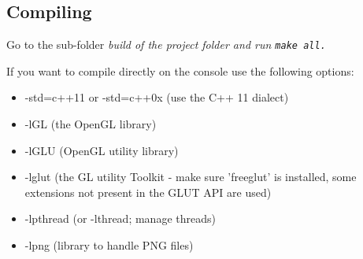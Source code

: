 \subsection{Compiling}
Go to the sub-folder \it{build} of the project folder and run \tt{make all}.\par
If you want to compile directly on the console use the following options:  
\begin{itemize}
	\item -std=c++11 or -std=c++0x (use the C++ 11 dialect)  
	\item -lGL (the OpenGL library)  
	\item -lGLU (OpenGL utility library)
	\item -lglut (the GL utility Toolkit - make sure 'freeglut' is installed, some extensions not present in the GLUT API are used)  
	\item -lpthread (or -lthread; manage threads)  
	\item -lpng (library to handle PNG files)
\end{itemize}
